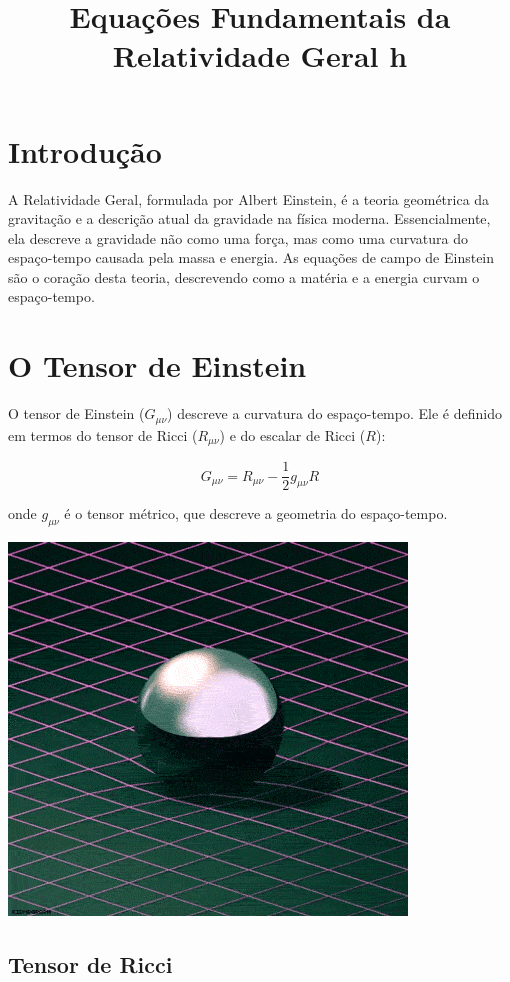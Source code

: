 \documentclass[a4paper,12pt]{article}
\title{Equações Fundamentais da Relatividade Geral h}
\author{}
\date{}
\begin{document}
\maketitle
\thispagestyle{empty}

\section*{Introdução}

A Relatividade Geral, formulada por Albert Einstein, é a teoria geométrica da gravitação e a descrição atual da gravidade na física moderna. Essencialmente, ela descreve a gravidade não como uma força, mas como uma curvatura do espaço-tempo causada pela massa e energia. As equações de campo de Einstein são o coração desta teoria, descrevendo como a matéria e a energia curvam o espaço-tempo.

\section{O Tensor de Einstein}

O tensor de Einstein ($G_{\mu\nu}$) descreve a curvatura do espaço-tempo. Ele é definido em termos do tensor de Ricci ($R_{\mu\nu}$) e do escalar de Ricci ($R$):

$$G_{\mu\nu} = R_{\mu\nu} - \frac{1}{2}g_{\mu\nu}R$$

onde $g_{\mu\nu}$ é o tensor métrico, que descreve a geometria do espaço-tempo.

\includegraphics{tensor.gif}

\subsection{Tensor de Ricci}
\end{document}
